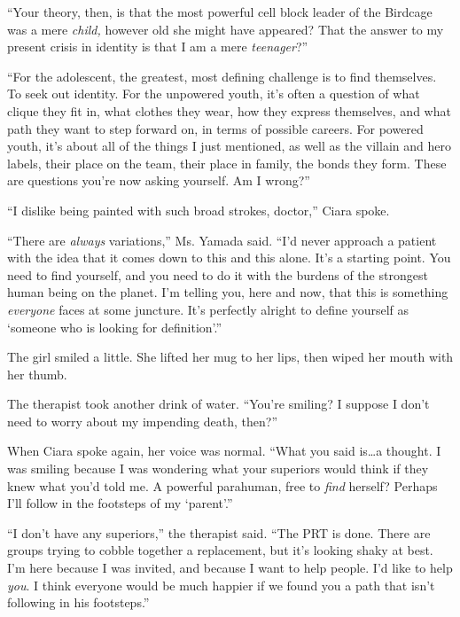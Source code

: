 ``Your theory, then, is that the most powerful cell block leader of the Birdcage was a mere \emph{child, }however old she might have appeared?  That the answer to my present crisis in identity is that I am a mere \emph{teenager}?''



``For the adolescent, the greatest, most defining challenge is to find themselves.  To seek out identity.  For the unpowered youth, it's often a question of what clique they fit in, what clothes they wear, how they express themselves, and what path they want to step forward on, in terms of possible careers.  For powered youth, it's about all of the things I just mentioned, as well as the villain and hero labels, their place on the team, their place in family, the bonds they form.  These are questions you're now asking yourself.  Am I wrong?''



``I dislike being painted with such broad strokes, doctor,'' Ciara spoke.



``There are \emph{always }variations,'' Ms. Yamada said.  ``I'd never approach a patient with the idea that it comes down to this and this alone.  It's a starting point.  You need to find yourself, and you need to do it with the burdens of the strongest human being on the planet.  I'm telling you, here and now, that this is something \emph{everyone} faces at some juncture.  It's perfectly alright to define yourself as `someone who is looking for definition'.''



The girl smiled a little.  She lifted her mug to her lips, then wiped her mouth with her thumb.



The therapist took another drink of water.  ``You're smiling?  I suppose I don't need to worry about my impending death, then?''



When Ciara spoke again, her voice was normal.  ``What you said is\ldots a thought.  I was smiling because I was wondering what your superiors would think if they knew what you'd told me.  A powerful parahuman, free to \emph{find} herself?  Perhaps I'll follow in the footsteps of my `parent'.''



``I don't have any superiors,'' the therapist said.  ``The PRT is done.  There are groups trying to cobble together a replacement, but it's looking shaky at best.  I'm here because I was invited, and because I want to help people.  I'd like to help \emph{you}.  I think everyone would be much happier if we found you a path that isn't following in his footsteps.''



